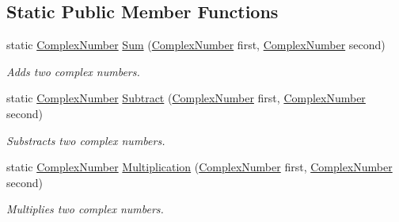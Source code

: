 \subsection*{Static Public Member Functions}
\begin{DoxyCompactItemize}
\item 
static \mbox{\hyperlink{class_test_project_1_1_task_library_1_1_tasks_1_1_lesson1_1_1_models_1_1_complex_number}{Complex\+Number}} \mbox{\hyperlink{class_test_project_1_1_task_library_1_1_tasks_1_1_lesson1_1_1_models_1_1_complex_number_a3fe7a71ee46f96889f4aa099fb381f1f}{Sum}} (\mbox{\hyperlink{class_test_project_1_1_task_library_1_1_tasks_1_1_lesson1_1_1_models_1_1_complex_number}{Complex\+Number}} first, \mbox{\hyperlink{class_test_project_1_1_task_library_1_1_tasks_1_1_lesson1_1_1_models_1_1_complex_number}{Complex\+Number}} second)
\begin{DoxyCompactList}\small\item\em Adds two complex numbers. \end{DoxyCompactList}\item 
static \mbox{\hyperlink{class_test_project_1_1_task_library_1_1_tasks_1_1_lesson1_1_1_models_1_1_complex_number}{Complex\+Number}} \mbox{\hyperlink{class_test_project_1_1_task_library_1_1_tasks_1_1_lesson1_1_1_models_1_1_complex_number_ab694005aab64bc920845b1c530b389fa}{Subtract}} (\mbox{\hyperlink{class_test_project_1_1_task_library_1_1_tasks_1_1_lesson1_1_1_models_1_1_complex_number}{Complex\+Number}} first, \mbox{\hyperlink{class_test_project_1_1_task_library_1_1_tasks_1_1_lesson1_1_1_models_1_1_complex_number}{Complex\+Number}} second)
\begin{DoxyCompactList}\small\item\em Substracts two complex numbers. \end{DoxyCompactList}\item 
static \mbox{\hyperlink{class_test_project_1_1_task_library_1_1_tasks_1_1_lesson1_1_1_models_1_1_complex_number}{Complex\+Number}} \mbox{\hyperlink{class_test_project_1_1_task_library_1_1_tasks_1_1_lesson1_1_1_models_1_1_complex_number_ab2f7c9ab46279b073a72c40867536d8d}{Multiplication}} (\mbox{\hyperlink{class_test_project_1_1_task_library_1_1_tasks_1_1_lesson1_1_1_models_1_1_complex_number}{Complex\+Number}} first, \mbox{\hyperlink{class_test_project_1_1_task_library_1_1_tasks_1_1_lesson1_1_1_models_1_1_complex_number}{Complex\+Number}} second)
\begin{DoxyCompactList}\small\item\em Multiplies two complex numbers. \end{DoxyCompactList}\item 

\end{DoxyCompactItemize}
